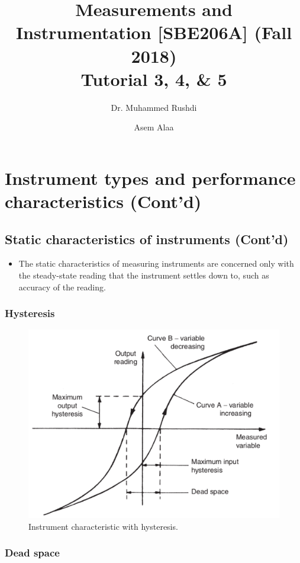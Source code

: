 \documentclass[a4paper,11pt,dvipsnames]{book}
\begin{document}
\author{Dr. Muhammed Rushdi \and Asem Alaa}

\title{Measurements and Instrumentation [SBE206A] (Fall 2018)\\ Tutorial 3, 4, \& 5}

\maketitle

\chapter*{Instrument types and performance characteristics (Cont'd)}


\section*{Static characteristics of instruments (Cont'd)}

\begin{itemize}
\item The static characteristics of measuring instruments are concerned only with the steady-state reading that the instrument settles down to, such as accuracy of the reading.
\end{itemize}

\subsection*{Hysteresis}


\begin{figure}[h!]\label{fig:hysteresis}
\centering
  \includegraphics[width=0.7\linewidth]{hysteresis}
  \caption{ Instrument characteristic with hysteresis.} 
\end{figure}


\subsection*{Dead space}
\end{document}

